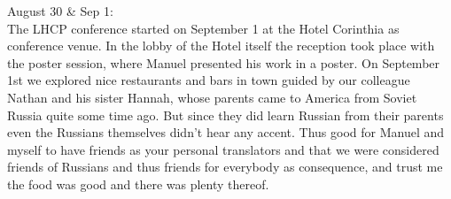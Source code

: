 August 30 \& Sep 1:\\
The LHCP conference started on September 1 at the Hotel Corinthia as conference venue. In the lobby of the Hotel itself the reception took place with the poster session, where Manuel presented his work in a poster. On September 1st we explored nice restaurants and bars in town guided by our colleague Nathan and his sister Hannah, whose parents came to America from Soviet Russia quite some time ago. But since they did learn Russian from their parents even the Russians themselves didn't hear any accent. Thus good for Manuel and myself to have friends as your personal translators and that we were considered friends of Russians and thus friends for everybody as consequence, and trust me the food was good and there was plenty thereof.\\

